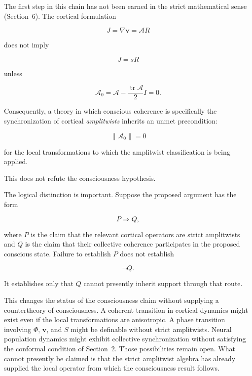 \documentclass[11pt]{article}
\begin{document}
The first step in this chain has not been earned in the strict mathematical sense (Section~6). The cortical formulation

\begin{equation}
J=\nabla\mathbf v=\mathcal A R
\end{equation}

does not imply

\begin{equation}
J=sR
\end{equation}

unless

\begin{equation}
\mathcal A_0
=
\mathcal A
-
\frac{\operatorname{tr}\mathcal A}{2}I
=
0.
\end{equation}

Consequently, a theory in which conscious coherence is specifically the synchronization of cortical \emph{amplitwists} inherits an unmet precondition:

\begin{equation}
\boxed{
\|\mathcal A_0\|=0
}
\end{equation}

for the local transformations to which the amplitwist classification is being applied.

This does not refute the consciousness hypothesis.

The logical distinction is important. Suppose the proposed argument has the form

\begin{equation}
P\Longrightarrow Q,
\end{equation}

where $P$ is the claim that the relevant cortical operators are strict amplitwists and $Q$ is the claim that their collective coherence participates in the proposed conscious state. Failure to establish $P$ does not establish

\begin{equation}
\neg Q.
\end{equation}

It establishes only that $Q$ cannot presently inherit support through that route.

This changes the status of the consciousness claim without supplying a countertheory of consciousness. A coherent transition in cortical dynamics might exist even if the local transformations are anisotropic. A phase transition involving $\Phi$, $\mathbf v$, and $S$ might be definable without strict amplitwists. Neural population dynamics might exhibit collective synchronization without satisfying the conformal condition of Section~2. Those possibilities remain open. What cannot presently be claimed is that the strict amplitwist algebra has already supplied the local operator from which the consciousness result follows.
\end{document}
